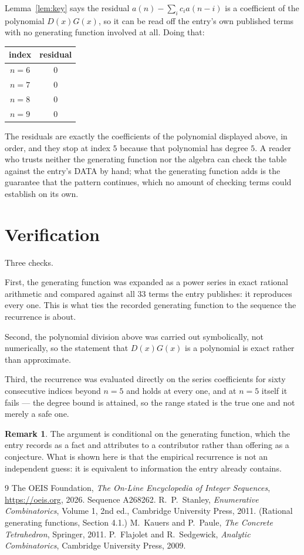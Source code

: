 \documentclass[11pt,a4paper]{article}
\theoremstyle{plain}
\theoremstyle{definition}
\newtheorem{remark}[theorem]{Remark}
\begin{document}
Lemma~\ref{lem:key} says the residual $a(n)-\sum_ic_ia(n-i)$ is a coefficient of the
polynomial $D(x)G(x)$, so it can be read off the entry's own published terms with no
generating function involved at all. Doing that:
\begin{center}
\begin{tabular}{cc}
index & residual \\ \hline
$n=6$ & $0$ \\
$n=7$ & $0$ \\
$n=8$ & $0$ \\
$n=9$ & $0$
\end{tabular}
\end{center}
The residuals are exactly the coefficients of the polynomial displayed above, in order, and
they stop at index $5$ because that polynomial has degree $5$. A reader who trusts
neither the generating function nor the algebra can check the table against the entry's DATA
by hand; what the generating function adds is the guarantee that the pattern continues, which
no amount of checking terms could establish on its own.

\section{Verification}

Three checks.

First, the generating function was expanded as a power series in exact rational arithmetic and
compared against all $33$ terms the entry publishes: it reproduces every one. This is
what ties the recorded generating function to the sequence the recurrence is about.

Second, the polynomial division above was carried out symbolically, not numerically, so the
statement that $D(x)G(x)$ is a polynomial is exact rather than approximate.

Third, the recurrence was evaluated directly on the series coefficients for sixty consecutive
indices beyond $n=5$ and holds at every one, and at $n=5$ itself it fails --- the
degree bound is attained, so the range stated is the true one and not merely a safe one.

\begin{remark}
The argument is conditional on the generating function, which the entry records as a fact and
attributes to a contributor rather than offering as a conjecture. What is shown here is that
the empirical recurrence is not an independent guess: it is equivalent to information the
entry already contains.
\end{remark}

\begin{thebibliography}{9}
 The OEIS Foundation, \emph{The On-Line Encyclopedia of Integer
Sequences}, \url{https://oeis.org}, 2026. Sequence A268262.
 R.~P.~Stanley, \emph{Enumerative Combinatorics}, Volume 1, 2nd ed.,
Cambridge University Press, 2011. (Rational generating functions, Section 4.1.)
 M.~Kauers and P.~Paule, \emph{The Concrete Tetrahedron}, Springer, 2011.
 P.~Flajolet and R.~Sedgewick, \emph{Analytic Combinatorics}, Cambridge
University Press, 2009.
\end{thebibliography}
\end{document}
